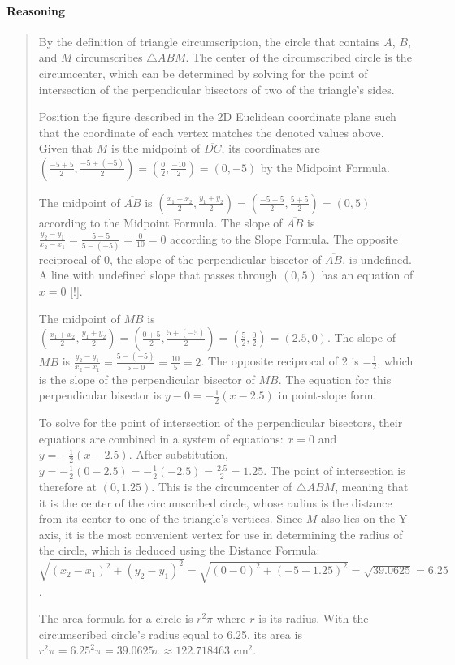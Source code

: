 \documentclass[letterpaper,12pt,twoside]{report}
\begin{document}
	\paragraph{Reasoning}
	\begin{quotation}
		
		By the definition of triangle circumscription, the circle that contains $A$, $B$, and $M$ circumscribes $\triangle ABM$. The center of the circumscribed circle is the circumcenter, which can be determined by solving for the point of intersection of the perpendicular bisectors of two of the triangle's sides.
		
		Position the figure described in the 2D Euclidean coordinate plane such that the coordinate of each vertex matches the denoted values above. Given that $M$ is the midpoint of $\overline{DC}$, its coordinates are $(\frac{-5+5}{2},\frac{-5+(-5)}{2})=(\frac{0}{2},\frac{-10}{2})=(0,-5)$ by the Midpoint Formula.
				
		The midpoint of $\overline{AB}$ is $(\frac{x_1+x_2}{2},\frac{y_1+y_2}{2})=(\frac{-5+5}{2},\frac{5+5}{2})=(0,5)$ according to the Midpoint Formula. The slope of $\overline{AB}$ is $\frac{y_2-y_1}{x_2-x_1}=\frac{5-5}{5-(-5)}=\frac{0}{10}=0$ according to the Slope Formula. The opposite reciprocal of 0, the slope of the perpendicular bisector of $\overline{AB}$, is undefined. A line with undefined slope that passes through $(0,5)$ has an equation of $x=0$ [!].
		
		The midpoint of $\overline{MB}$ is $(\frac{x_1+x_2}{2},\frac{y_1+y_2}{2})=(\frac{0+5}{2},\frac{5+(-5)}{2})=(\frac{5}{2},\frac{0}{2})=(2.5,0)$. The slope of $\overline{MB}$ is $\frac{y_2-y_1}{x_2-x_1}=\frac{5-(-5)}{5-0}=\frac{10}{5}=2$. The opposite reciprocal of 2 is $-\frac{1}{2}$, which is the slope of the perpendicular bisector of $\overline{MB}$. The equation for this perpendicular bisector is $y-0=-\frac{1}{2}(x-2.5)$ in point-slope form.
		
		To solve for the point of intersection of the perpendicular bisectors, their equations are combined in a system of equations: $x=0$ and $y=-\frac{1}{2}(x-2.5)$. After substitution, $y=-\frac{1}{2}(0-2.5)=-\frac{1}{2}(-2.5)=\frac{2.5}{2}=1.25$. The point of intersection is therefore at $(0,1.25)$. This is the circumcenter of $\triangle ABM$, meaning that it is the center of the circumscribed circle, whose radius is the distance from its center to one of the triangle's vertices. Since $M$ also lies on the Y axis, it is the most convenient vertex for use in determining the radius of the circle, which is deduced using the Distance Formula: $\sqrt{(x_2-x_1)^2+(y_2-y_1)^2}=\sqrt{(0-0)^2+(-5-1.25)^2}=\sqrt{39.0625}=6.25$.
		
		The area formula for a circle is $r^2 \pi$ where $r$ is its radius. With the circumscribed circle's radius equal to 6.25, its area is $r^2\pi=6.25^2\pi=\boxed{39.0625\pi\approx 122.718463 \text{  cm}^2}$.
		
	\end{quotation}
	
\end{document}
